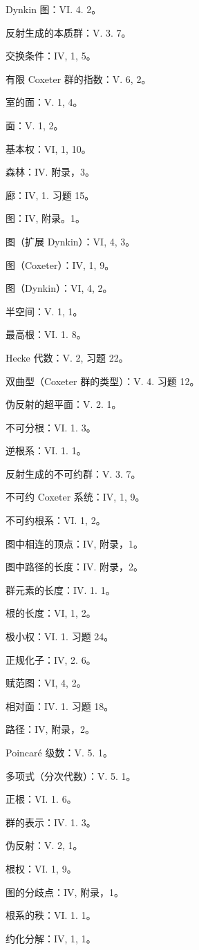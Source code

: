 Dynkin 图：VI. 4. 2。

反射生成的本质群：V. 3. 7。

交换条件：IV, 1, 5。

有限 Coxeter 群的指数：V. 6, 2。

室的面：V. 1, 4。

面：V. 1, 2。

基本权：VI, 1, 10。

森林：IV. 附录，3。

廊：IV, 1. 习题 15。

图：IV, 附录。1。

图（扩展 Dynkin）：VI, 4, 3。

图（Coxeter）：IV, 1, 9。

图（Dynkin）：VI, 4, 2。

半空间：V. 1, 1。

最高根：VI. 1. 8。

Hecke 代数：V. 2, 习题 22。

双曲型（Coxeter 群的类型）：V. 4. 习题 12。

伪反射的超平面：V. 2. 1。

不可分根：VI. 1. 3。

逆根系：VI. 1. 1。

反射生成的不可约群：V. 3. 7。

不可约 Coxeter 系统：IV, 1, 9。

不可约根系：VI. 1, 2。

图中相连的顶点：IV, 附录，1。

图中路径的长度：IV. 附录，2。

群元素的长度：IV. 1. 1。

根的长度：VI, 1, 2。

极小权：VI. 1. 习题 24。

正规化子：IV, 2. 6。

赋范图：VI, 4, 2。

相对面：IV. 1. 习题 18。

路径：IV, 附录，2。

Poincaré 级数：V. 5. 1。

多项式（分次代数）：V. 5. 1。

正根：VI. 1. 6。

群的表示：IV. 1. 3。

伪反射：V. 2, 1。

根权：VI. 1, 9。

图的分歧点：IV, 附录，1。

根系的秩：VI. 1. 1。

约化分解：IV, 1, 1。

